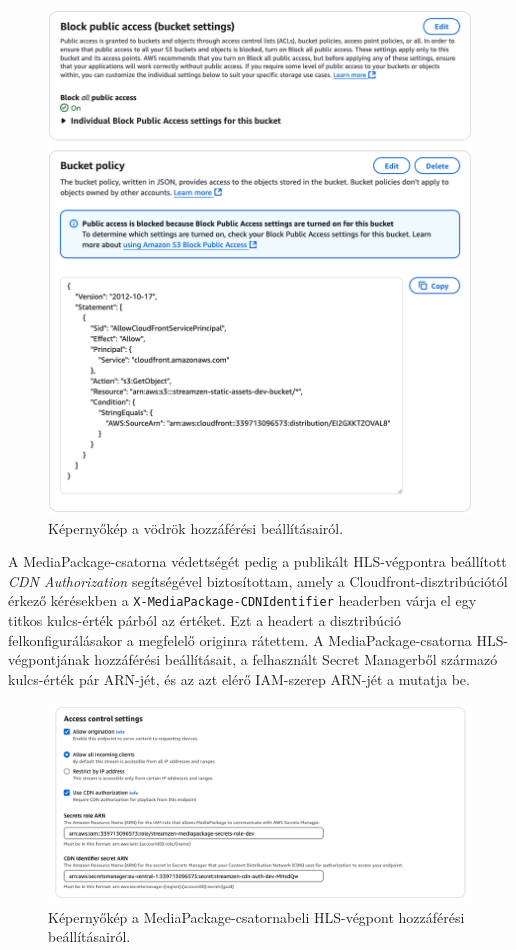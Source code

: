 \begin{figure}[ht]
  \centering
  \includegraphics[width=150mm, keepaspectratio]{figures/distro_s3policy.png}
  \caption{Képernyőkép a vödrök hozzáférési beállításairól.}
  \label{fig:s3policy}
\end{figure}

A MediaPackage-csatorna védettségét pedig a publikált HLS-végpontra beállított \emph{CDN Authorization}\cite{cdnauth} segítségével biztosítottam, amely a Cloudfront-disztribúciótól érkező kérésekben a \verb|X-MediaPackage-CDNIdentifier| headerben várja el egy titkos kulcs-érték párból az értéket. Ezt a headert a disztribúció felkonfigurálásakor a megfelelő originra rátettem. A MediaPackage-csatorna HLS-végpontjának hozzáférési beállításait, a felhasznált Secret Managerből származó kulcs-érték pár ARN-jét, és az azt elérő IAM-szerep ARN-jét a  mutatja be.

\begin{figure}[ht]
  \centering
  \includegraphics[width=150mm, keepaspectratio]{figures/distro_mediapack.png}
  \caption{Képernyőkép a MediaPackage-csatornabeli HLS-végpont hozzáférési beállításairól.}
  \label{fig:mediapack}
\end{figure}

